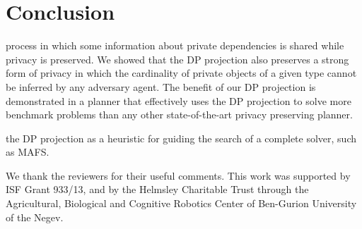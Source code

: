 \documentclass[letterpaper]{article}
\theoremstyle{definition}
\begin{document}
\vspace{-1.74mm}
\section{Conclusion}
process in which some information about private dependencies is shared while privacy is preserved. We showed that the DP projection also preserves a strong form of privacy in which the cardinality of private objects of a given type cannot be inferred by any adversary agent. The benefit of our DP projection is demonstrated in a planner that effectively uses the DP projection to solve more benchmark problems than any other state-of-the-art privacy preserving planner.

the DP projection as a heuristic for guiding the search of a complete solver, such as MAFS.

 We thank the reviewers for their useful comments. This work was supported by ISF Grant 933/13, and by the Helmsley Charitable Trust through the Agricultural, Biological and Cognitive Robotics Center of Ben-Gurion University of the Negev.









\clearpage

\end{document}

